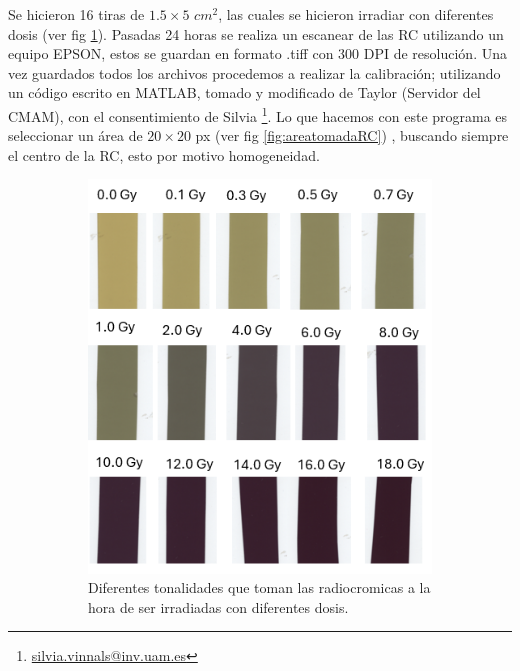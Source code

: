 \documentclass[onecolumn,12pt]{article} %
\begin{document}
Se hicieron 16 tiras de $1.5 \times 5$ $cm^2$, las cuales se hicieron irradiar con diferentes dosis (ver fig \ref{fig:tonosRC}). Pasadas 24 horas se realiza un escanear de las RC utilizando un equipo EPSON, estos se guardan en formato .tiff con 300 DPI de resolución. Una vez guardados todos los archivos procedemos a realizar la calibración; utilizando un código escrito en  MATLAB,  tomado y modificado de Taylor (Servidor del CMAM), con el consentimiento de Silvia \footnote{\href{silvia.vinnals@inv.uam.es }{silvia.vinnals@inv.uam.es}}. Lo que hacemos con este programa es seleccionar un área de $20\times 20 $ px (ver fig \ref{fig:areatomadaRC}) , buscando siempre el centro de la RC, esto por motivo homogeneidad. 
\begin{figure}[H]
    \centering
    \begin{subfigure}[b]{0.45\textwidth}
        \centering
        \includegraphics[width=\textwidth]{img_exp/calibracionRC.png}
        \caption{Diferentes tonalidades que toman las radiocromicas a la hora de ser irradiadas con diferentes dosis.}
        \label{fig:tonosRC}
    \end{subfigure}
    \hfill
    \begin{subfigure}[b]{0.5\textwidth}

\end{subfigure}
\end{figure}
\end{document}
